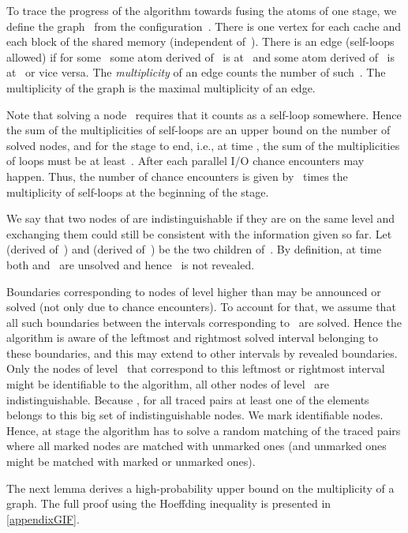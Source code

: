 \documentclass[envcountsame]{llncs}
\begin{document}
To trace the progress of the algorithm towards fusing the atoms of one stage, we define the graph~ from the configuration~.
There is one vertex for each cache and each block of the shared memory (independent of~).
There is an edge (self-loops allowed)  if for some~ some atom derived of~ is at~ and some atom derived of~ is at~ or vice versa.
The \emph{multiplicity} of an edge counts the number of such~.
The multiplicity of the graph is the maximal multiplicity of an edge.

Note that solving a node~ requires that it counts as a self-loop somewhere.
Hence the sum of the multiplicities of self-loops are an upper bound on the number of solved nodes, and for the stage to end, i.e., at time , the sum of the multiplicities of loops must be at least~.
After each parallel I/O chance encounters may happen.
Thus, the number of chance encounters is given by~ times the  multiplicity of self-loops at the beginning of the stage.



We say that two nodes of \binaryTreeOf{\gifInstance} are indistinguishable if they are on the same level and exchanging them could still be consistent with the information given so far.
Let~ (derived of~) and  (derived of~) be the two children of~.
By definition, at time~ both  and~ are unsolved and hence~ is not revealed. 

Boundaries corresponding to nodes of level higher than \levelOfTracedAtoms may be announced or solved (not only due to chance encounters). 
To account for that, we assume that all such boundaries between the intervals corresponding to~ are solved.
Hence the algorithm is aware of the leftmost and rightmost solved interval belonging to these boundaries, and this may extend to other intervals by revealed boundaries.
Only the nodes of level~ that correspond to this leftmost or rightmost interval might be identifiable to the algorithm, all other nodes of level~ are indistinguishable. 
Because , for all traced pairs  at least one of the elements belongs to this big set of indistinguishable nodes.
We mark identifiable nodes. Hence, at stage  the algorithm has to solve a random matching of the traced pairs where all marked nodes are matched with unmarked ones (and unmarked ones might be matched with marked or unmarked ones). 


The next lemma derives a high-probability upper bound on the multiplicity of a graph. 
The full proof using the Hoeffding inequality is presented in \autoref{appendixGIF}.
\end{document}
